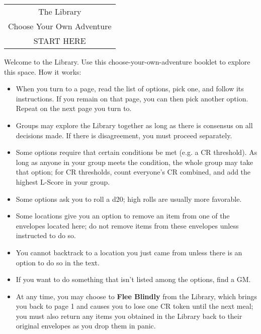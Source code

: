 \documentclass[sheet]{GL2020}
\begin{document}
\begin{center}\LARGE\bf\begin{tabular}{|c|}
  \hline The Library\\ Choose Your Own Adventure\\ START HERE\\ \hline
\end{tabular}\end{center}

Welcome to the Library. Use this choose-your-own-adventure booklet to explore this space. How it works:
\begin{itemize}
  \item When you turn to a page, read the list of options, pick one, and follow its instructions. If you remain on that page, you can then pick another option. Repeat on the next page you turn to.
  \item Groups may explore the Library together as long as there is consensus on all decisions made. If there is disagreement, you must proceed separately.
  \item Some options require that certain conditions be met (e.g. a CR threshold). As long as anyone in your group meets the condition, the whole group may take that option; for CR thresholds, count everyone’s CR combined, and add the highest L-Score in your group. 
  \item Some options ask you to roll a d20; high rolls are usually more favorable. 
  \item Some locations give you an option to remove an item from one of the envelopes located here; do not remove items from these envelopes unless instructed to do so. 
  \item You cannot backtrack to a location you just came from unless there is an option to do so in the text. 
  \item If you want to do something that isn’t listed among the options, find a GM. 
  \item At any time, you may choose to \textbf{Flee Blindly} from the Library, which brings you back to page 1 and causes you to lose one CR token until the next meal; you must also return any items you obtained in the Library back to their original envelopes as you drop them in panic.
\end{itemize}
\end{document}
